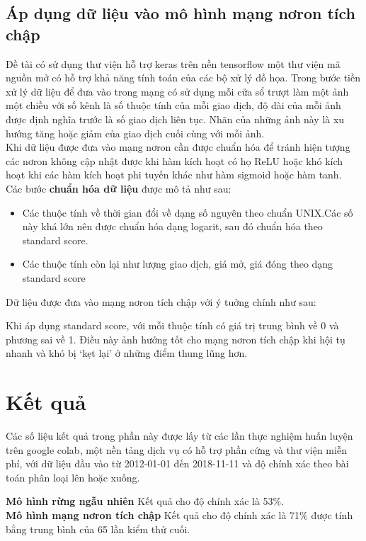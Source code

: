  \subsection{Áp dụng dữ liệu vào mô hình mạng nơron tích chập}
 Đề tài có sử dụng thư viện hỗ trợ keras trên nền tensorflow một thư viện mã nguồn mở có hỗ trợ khả năng tính toán của các bộ xử lý đồ họa. Trong bước tiền xử lý dữ liệu để đưa vào trong mạng có sử dụng mỗi cửa sổ trượt làm một ảnh một chiều với số kênh là số thuộc tính của mỗi giao dịch, độ dài của mỗi ảnh được định nghĩa trước là số giao dịch liên tục. Nhãn của những ảnh này là xu hướng tăng hoặc giảm của giao dịch cuối cùng với mỗi ảnh.\\
  Khi dữ liệu được đưa vào mạng nơron cần được chuẩn hóa để tránh hiện tượng các nơron không cập nhật được khi hàm kích hoạt có họ ReLU hoặc khó kích hoạt khi các hàm kích hoạt phi tuyến khác như hàm sigmoid hoặc hàm tanh.\\ Các bước \textbf{chuẩn hóa dữ liệu} được mô tả như sau:
 \begin{itemize}
 	\item Các thuộc tính về thời gian đổi về dạng số nguyên theo chuẩn UNIX.Các số này khá lớn nên được chuẩn hóa dạng logarit, sau đó chuẩn hóa theo standard score.
 	\item Các thuộc tính còn lại như lượng giao dịch, giá mở, giá đóng theo dạng standard score
 \end{itemize}

Dữ liệu được đưa vào mạng nơron tích chập với ý tuởng chính như sau:



Khi áp dụng standard score, với mỗi thuộc tính có giá trị trung bình về 0 và phương sai về 1. Điều này ảnh hưởng tốt cho mạng nơron tích chập khi hội tụ nhanh và khó bị `kẹt lại' ở những điểm thung lũng hơn.

 
 \section{Kết quả}
 Các số liệu kết quả trong phần này được lấy từ các lần thực nghiệm huấn luyện trên google colab, một nền tảng dịch vụ có hỗ trợ phần cứng và thư viện miễn phí, với dữ liệu đầu vào từ  2012-01-01 đến 2018-11-11 và độ chính xác theo bài toán phân loại lên hoặc xuống.
 
  \textbf{Mô hình rừng ngẫu nhiên} Kết quả cho độ chính xác là 53\%. \\
  \textbf{Mô hình mạng nơron tích chập} Kết quả cho độ chính xác là 71\% được tính bằng trung bình của 65 lần kiểm thử cuối. %
 
 